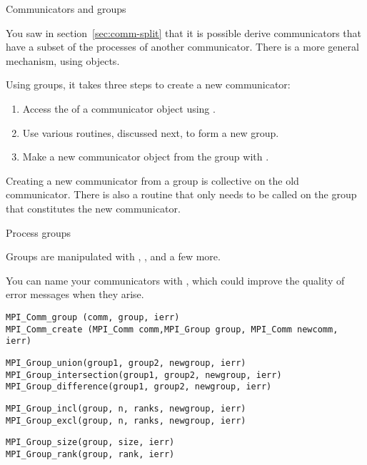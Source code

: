 
 {Communicators and groups}

You saw in section~\ref{sec:comm-split} that it is possible derive
communicators that have a subset of the processes of another communicator.
There is a more general mechanism, using 
objects.


Using groups, it takes three steps to create a new communicator:
\begin{enumerate}
\item Access the  of a communicator
  object using .
  
\item Use various routines, discussed next, to form a new group.
\item Make a new communicator object from the group with
  .

\end{enumerate}

Creating a new communicator from a group is collective on the old communicator.
There is also a routine  that only
needs to be called on the group that constitutes the new communicator.

 {Process groups}
\label{sec:comm-group}

Groups are manipulated with
, ,
 and a few more.

You can name your communicators with , which
could improve the quality of error messages when they arise.

\begin{lstlisting}
MPI_Comm_group (comm, group, ierr)
MPI_Comm_create (MPI_Comm comm,MPI_Group group, MPI_Comm newcomm, ierr)
\end{lstlisting}

\begin{lstlisting}
MPI_Group_union(group1, group2, newgroup, ierr)
MPI_Group_intersection(group1, group2, newgroup, ierr)
MPI_Group_difference(group1, group2, newgroup, ierr)
\end{lstlisting}

\begin{lstlisting}
MPI_Group_incl(group, n, ranks, newgroup, ierr)
MPI_Group_excl(group, n, ranks, newgroup, ierr)
\end{lstlisting}
\begin{lstlisting}
MPI_Group_size(group, size, ierr)
MPI_Group_rank(group, rank, ierr)
\end{lstlisting}

